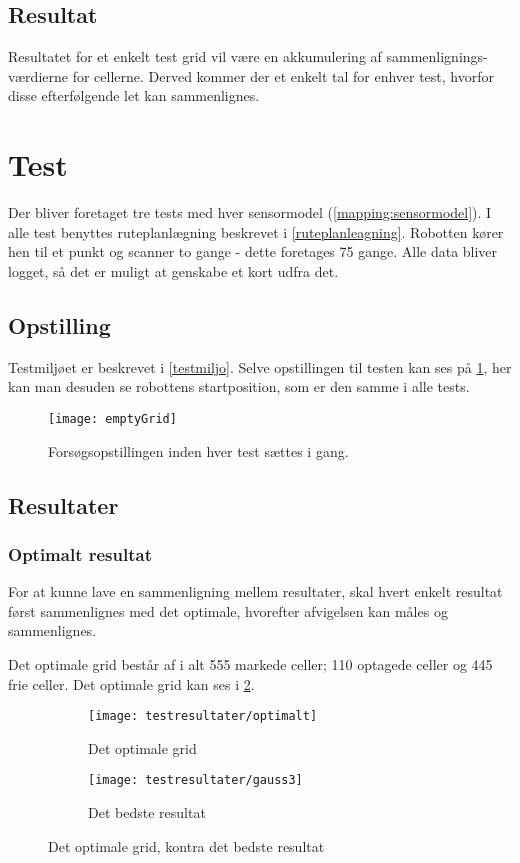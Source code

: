 \subsection{Resultat}
Resultatet for et enkelt test grid vil være en akkumulering af sammenlignings-værdierne for cellerne.
Derved kommer der et enkelt tal for enhver test, hvorfor disse efterfølgende let kan sammenlignes.

\section{Test}\label{evaluering:test_beskrivelse}
Der bliver foretaget tre tests med hver sensormodel (\cref{mapping:sensormodel}).
I alle test benyttes ruteplanlægning beskrevet i \cref{ruteplanleagning}.
Robotten kører hen til et punkt og scanner to gange - dette foretages 75 gange.
Alle data bliver logget, så det er muligt at genskabe et kort udfra det.

\subsection{Opstilling}\label{evaluering:opstilling}
Testmiljøet er beskrevet i \cref{testmiljo}.
Selve opstillingen til testen kan ses på \cref{evaluering:emptyGrid}, her kan man desuden se robottens startposition, som er den samme i alle tests.

\begin{figure}[h]
\texttt{[image: emptyGrid]}
\caption{Forsøgsopstillingen inden hver test sættes i gang.}
\label{evaluering:emptyGrid}
\end{figure}

\subsection{Resultater}

\subsubsection*{Optimalt resultat}
For at kunne lave en sammenligning mellem resultater, skal hvert enkelt resultat først sammenlignes med det optimale, hvorefter afvigelsen kan måles og sammenlignes.

Det optimale grid består af i alt 555 markede celler; 110 optagede celler og 445 frie celler.
Det optimale grid kan ses i \cref{evaluering:optimaltgrid}.

\begin{figure}[h]
\centering
\begin{subfigure}[b]{.48\textwidth}
\centering
\texttt{[image: testresultater/optimalt]}
\caption{Det optimale grid}
\label{evaluering:optimaltgrid}
\end{subfigure}
\begin{subfigure}[b]{.48\textwidth}
\centering
\texttt{[image: testresultater/gauss3]}
\caption{Det bedste resultat}
\label{evaluering:gauss3}
\end{subfigure}
\caption{Det optimale grid, kontra det bedste resultat}
\label{evaluering:optvsbedst}
\end{figure}

